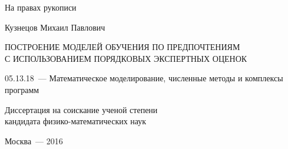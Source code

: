 
\begin{titlepage}
\begin{flushright}
{На правах рукописи}
\end{flushright}
\vspace{1.5cm}
\begin{center}
{Кузнецов Михаил Павлович}
\par
\vspace{2cm}
\textsc{ПОСТРОЕНИЕ МОДЕЛЕЙ ОБУЧЕНИЯ ПО ПРЕДПОЧТЕНИЯМ \\
        С ИСПОЛЬЗОВАНИЕМ ПОРЯДКОВЫХ ЭКСПЕРТНЫХ ОЦЕНОК}
\par
\vspace{2cm}
{05.13.18~--- Математическое моделирование, численные методы и комплексы программ}
\par
\vspace{2cm}
{Диссертация на соискание ученой степени\\
кандидата физико-математических наук}
\end{center}
\par
\vspace{3.5cm}
\begin{center}
{Москва~--- 2016}
\end{center}
\end{titlepage}


